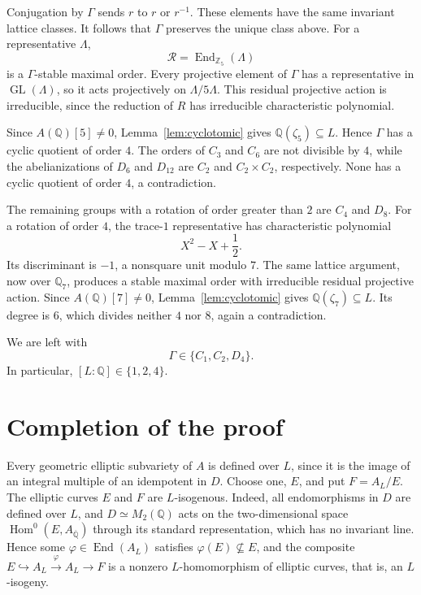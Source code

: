 \documentclass[11pt]{article}
\newcommand{\Q}{\mathbb Q}
\newcommand{\Z}{\mathbb Z}
\DeclareMathOperator{\End}{End}
\DeclareMathOperator{\GL}{GL}
\begin{document}
Conjugation by \(\Gamma\) sends \(r\) to \(r\) or \(r^{-1}\).
These elements have the same invariant lattice classes. It
follows that \(\Gamma\) preserves the unique class above.
For a representative \(\Lambda\),
\[
 \mathcal R=\End_{\Z_5}(\Lambda)
\]
is a \(\Gamma\)-stable maximal order. Every projective element
of \(\Gamma\) has a representative in
\(\GL(\Lambda)\), so it acts projectively on
\(\Lambda/5\Lambda\). This residual projective action is
irreducible, since the reduction of \(R\) has irreducible
characteristic polynomial.

Since \(A(\Q)[5]\neq0\), Lemma~\ref{lem:cyclotomic} gives
\(\Q(\zeta_5)\subseteq L\). Hence \(\Gamma\) has a cyclic quotient
of order \(4\). The orders of \(C_3\) and \(C_6\) are not divisible
by \(4\), while the abelianizations of \(D_6\) and \(D_{12}\) are
\(C_2\) and \(C_2\times C_2\), respectively. None has a cyclic
quotient of order \(4\), a contradiction.

The remaining groups with a rotation of order greater than \(2\)
are \(C_4\) and \(D_8\). For a rotation of order \(4\), the
trace-\(1\) representative has characteristic polynomial
\[
 X^2-X+\frac12.
\]
Its discriminant is \(-1\), a nonsquare unit modulo \(7\).
The same lattice argument, now over \(\Q_7\), produces a stable
maximal order with irreducible residual projective action.
Since \(A(\Q)[7]\neq0\), Lemma~\ref{lem:cyclotomic} gives
\(\Q(\zeta_7)\subseteq L\). Its degree is \(6\), which divides
neither \(4\) nor \(8\), again a contradiction.

We are left with
\[
 \Gamma\in\{C_1,C_2,D_4\}.
\]
In particular, \([L:\Q]\in\{1,2,4\}\).

\section{Completion of the proof}

Every geometric elliptic subvariety of \(A\) is defined over \(L\),
since it is the image of an integral multiple of an idempotent in
\(D\). Choose one, \(E\), and put \(F=A_L/E\). The elliptic curves
\(E\) and \(F\) are \(L\)-isogenous. Indeed, all endomorphisms in
\(D\) are defined over \(L\), and \(D\simeq M_2(\Q)\) acts on the
two-dimensional space \(\operatorname{Hom}^0(E,A_{\overline{\Q}})\)
through its standard representation, which has no invariant line.
Hence some \(\varphi\in\End(A_L)\) satisfies
\(\varphi(E)\not\subseteq E\), and the composite
\(E\hookrightarrow A_L\xrightarrow{\varphi}A_L\to F\) is a nonzero
\(L\)-homomorphism of elliptic curves, that is, an \(L\)-isogeny.
\end{document}
